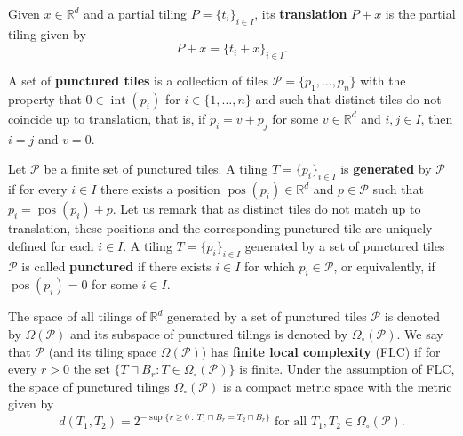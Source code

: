 \documentclass{article}
\theoremstyle{definition}
\theoremstyle{definition}
\newcommand{\R}{\mathbb{R}}
\newcommand{\PP}{\mathcal{P}}
\newcommand{\define}[1]{\textbf{#1}}
\begin{document}
Given $x\in \R^d$ and a partial tiling $P=\{t_i\}_{i\in I}$, its \define{translation} $P+x$ is the partial tiling given by \[P+x = \{t_i + x\}_{i\in I}.\]

A set of \define{punctured tiles} is a collection of tiles $\PP = \{p_1,\dots,p_n\}$ with the property that $0 \in \operatorname{int}(p_i)$ for $i \in \{1,\dots,n\}$ and such that distinct tiles do not coincide up to translation, that is, if $p_i = v + p_j$ for some $v \in \R^d$ and $i,j \in I$, then $i =j$ and $v = 0$. 

Let $\PP$ be a finite set of punctured tiles. A tiling $T = \{p_i\}_{i \in I}$ is \define{generated} by $\PP$ if for every $i \in I$ there exists a position $\operatorname{pos}(p_i) \in \R^d$ and $p \in \PP$ such that $p_i = \operatorname{pos}(p_i) + p$. Let us remark that as distinct tiles do not match up to translation, these positions and the corresponding punctured tile are uniquely defined for each $i \in I$. A tiling $T = \{p_i\}_{i \in I}$ generated by a set of punctured tiles $\PP$ is called \define{punctured} if there exists $i \in I$ for which $p_i \in \PP$, or equivalently, if $\operatorname{pos}(p_i)=0$ for some $i \in I$.


The space of all tilings of $\R^d$ generated by a set of punctured tiles $\PP$ is denoted by $\Omega(\PP)$ and its subspace of punctured tilings is denoted by $\Omega_{\circ}(\PP)$. We say that $\PP$ (and its tiling space $\Omega(\mathcal{P})$) has \define{finite local complexity} (FLC) if for every $r>0$ the set $\{T\sqcap B_r : T \in \Omega_\circ(\mathcal{P})\}$ is finite. Under the assumption of FLC, the space of punctured tilings $\Omega_\circ(\PP)$ is a compact metric space with the metric given by \[ d(T_1,T_2) = 2^{-\sup\{r \geq 0\ :\ T_1\sqcap B_r = T_2 \sqcap B_r\}} \mbox{ for all } T_1,T_2  \in \Omega_{\circ}(\mathcal{P}). \]
\end{document}
